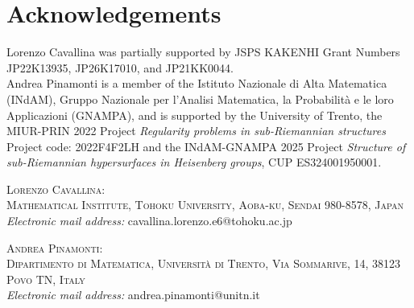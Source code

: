 \documentclass[a4paper,11pt]{article}
\numberwithin{equation}{section}
\begin{document}
\section*{Acknowledgements}
Lorenzo Cavallina was partially supported by JSPS KAKENHI Grant Numbers JP22K13935, JP26K17010, and JP21KK0044.\\
Andrea Pinamonti is a member of the Istituto Nazionale di Alta Matematica (INdAM), Gruppo Nazionale per l'Analisi Matematica, la Probabilit\`a e le loro Applicazioni (GNAMPA), and is supported by the University of Trento, the MIUR-PRIN 2022 Project \emph{Regularity problems in sub-Riemannian structures}  Project code: 2022F4F2LH and the INdAM-GNAMPA 2025 Project \emph{Structure of sub-Riemannian hypersurfaces in Heisenberg groups}, CUP ES324001950001.




\bigskip


\noindent
\textsc{Lorenzo Cavallina:}\\
\noindent
\textsc{
Mathematical Institute, Tohoku University, Aoba-ku, 
Sendai 980-8578, Japan}\\
\noindent
{\em Electronic mail address:}
cavallina.lorenzo.e6@tohoku.ac.jp

\bigskip

\noindent
\textsc{Andrea Pinamonti:}\\
\noindent
\textsc{Dipartimento di Matematica, Universit\`a di Trento,
Via Sommarive, 14, 38123 Povo TN, Italy
}
\\
\noindent
{\em Electronic mail address:}
andrea.pinamonti@unitn.it
\end{document}
